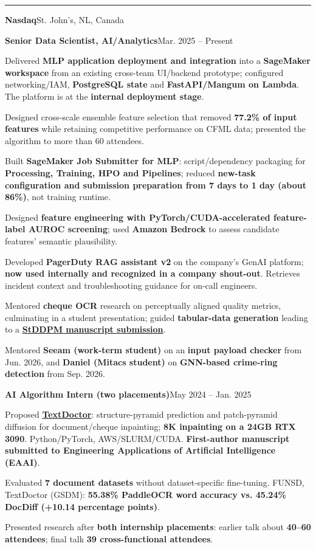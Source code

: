 \documentclass[11pt,letterpaper]{article}
\newcommand{\cvsection}[1]{\par\addvspace{6pt}{\large\bfseries #1}\par\vspace{1pt}\hrule\vspace{3pt}}
\newcommand{\company}[2]{\par\addvspace{4pt}\textbf{#1}\hfill{\small\color{muted}#2}\par}
\newcommand{\position}[2]{\par\addvspace{2pt}\textbf{#1}\hfill{\small #2}\par}
\newenvironment{points}{\begin{list}{\textbullet}{\setlength{\leftmargin}{12pt}\setlength{\itemsep}{1.2pt}\setlength{\parsep}{0pt}\setlength{\topsep}{1.5pt}\setlength{\partopsep}{0pt}}}{\end{list}}
\begin{document}
\cvsection{Professional Experience}
\company{Nasdaq}{St. John's, NL, Canada}
\position{Senior Data Scientist, AI/Analytics}{Mar. 2025 -- Present}
\begin{points}
\item Delivered \textbf{MLP application deployment and integration} into a \textbf{SageMaker workspace} from an existing cross-team UI/backend prototype; configured networking/IAM, \textbf{PostgreSQL state} and \textbf{FastAPI/Mangum on Lambda}. The platform is at the \textbf{internal deployment stage}.
\item Designed cross-scale ensemble feature selection that removed \textbf{77.2\% of input features} while retaining competitive performance on CFML data; presented the algorithm to more than 60 attendees.
\item Built \textbf{SageMaker Job Submitter for MLP}: script/dependency packaging for \textbf{Processing, Training, HPO and Pipelines}; reduced \textbf{new-task configuration and submission preparation from 7 days to 1 day (about 86\%)}, not training runtime.
\item Designed \textbf{feature engineering with PyTorch/CUDA-accelerated feature-label AUROC screening}; used \textbf{Amazon Bedrock} to assess candidate features' semantic plausibility.
\item Developed \textbf{PagerDuty RAG assistant v2} on the company's GenAI platform; \textbf{now used internally and recognized in a company shout-out}. Retrieves incident context and troubleshooting guidance for on-call engineers.
\item Mentored \textbf{cheque OCR} research on perceptually aligned quality metrics, culminating in a student presentation; guided \textbf{tabular-data generation} leading to a \href{https://doi.org/10.21203/rs.3.rs-7624993/v1}{\textbf{StDDPM manuscript submission}}.
\item Mentored \textbf{Seeam (work-term student)} on an \textbf{input payload checker} from Jun. 2026, and \textbf{Daniel (Mitacs student)} on \textbf{GNN-based crime-ring detection} from Sep. 2026.
\end{points}
\position{AI Algorithm Intern (two placements)}{May 2024 -- Jan. 2025}
\begin{points}
\item Proposed \href{https://arxiv.org/abs/2503.04021}{\textbf{TextDoctor}}: structure-pyramid prediction and patch-pyramid diffusion for document/cheque inpainting; \textbf{8K inpainting on a 24GB RTX 3090}. Python/PyTorch, AWS/SLURM/CUDA. \textbf{First-author manuscript submitted to Engineering Applications of Artificial Intelligence (EAAI)}.
\item Evaluated \textbf{7 document datasets} without dataset-specific fine-tuning. FUNSD, TextDoctor (GSDM): \textbf{55.38\% PaddleOCR word accuracy vs. 45.24\% DocDiff (+10.14 percentage points)}.
\item Presented research after \textbf{both internship placements}: earlier talk about \textbf{40--60 attendees}; final talk \textbf{39 cross-functional attendees}.
\end{points}
\end{document}
